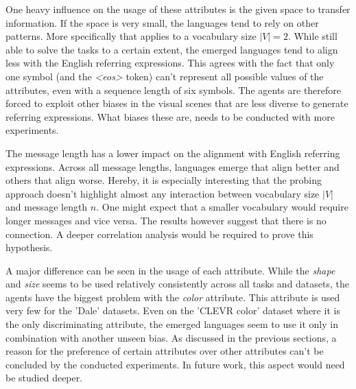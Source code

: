 One heavy influence on the usage of these attributes is the given space to transfer information.
If the space is very small, the languages tend to rely on other patterns.
More specifically that applies to a vocabulary size $|V|=2$.
While still able to solve the tasks to a certain extent, the emerged languages tend to align less with the English referring expressions.
This agrees with the fact that only one symbol (and the \emph{<eos>} token) can't represent all possible values of the attributes, even with a sequence length of six symbols.
The agents are therefore forced to exploit other biases in the visual scenes that are less diverse to generate referring expressions.
What biases these are, needs to be conducted with more experiments.

The message length has a lower impact on the alignment with English referring expressions.
Across all message lengths, languages emerge that align better and others that align worse.
Hereby, it is especially interesting that the probing approach doesn't highlight almost any interaction between vocabulary size $|V|$ and message length $n$.
One might expect that a smaller vocabulary would require longer messages and vice versa.
The results however suggest that there is no connection.
A deeper correlation analysis would be required to prove this hypothesis.

A major difference can be seen in the usage of each attribute.
While the \emph{shape} and \emph{size} seems to be used relatively consistently across all tasks and datasets, the agents have the biggest problem with the \emph{color} attribute.
This attribute is used very few for the 'Dale' datasets.
Even on the 'CLEVR color' dataset where it is the only discriminating attribute, the emerged languages seem to use it only in combination with another unseen bias.
As discussed in the previous sections, a reason for the preference of certain attributes over other attributes can't be concluded by the conducted experiments.
In future work, this aspect would need be studied deeper.

